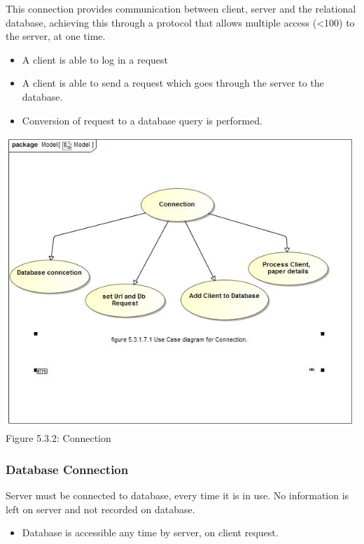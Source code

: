 \documentclass[hidelinks,a4paper,12pt]{article}
\begin{document}
	This connection provides communication between client, server     
	and the relational database, achieving this through a 	protocol 
	that allows multiple access (<100) to the server, at 	one time.
	\begin{itemize}
		\item A client is able to log in a request 
		
		\item A client is able to send a request which goes through the server 	to the database.
		
		\item Conversion of request to a database query is performed.      	
	\end{itemize}
	
	\includegraphics[width=1\textwidth]{./Graphs/UseCaseforConnection.JPG}\\[0.4cm]  
	Figure 5.3.2: Connection
	
	\subsubsection{Database Connection}
	
	Server must be connected to database, every time it is in use. 
	No information is left on server and not recorded on database.  
	
	\begin{itemize}
			\item Database is accessible any time by server, on client request. 
	\end{itemize}
	
\end{document}
